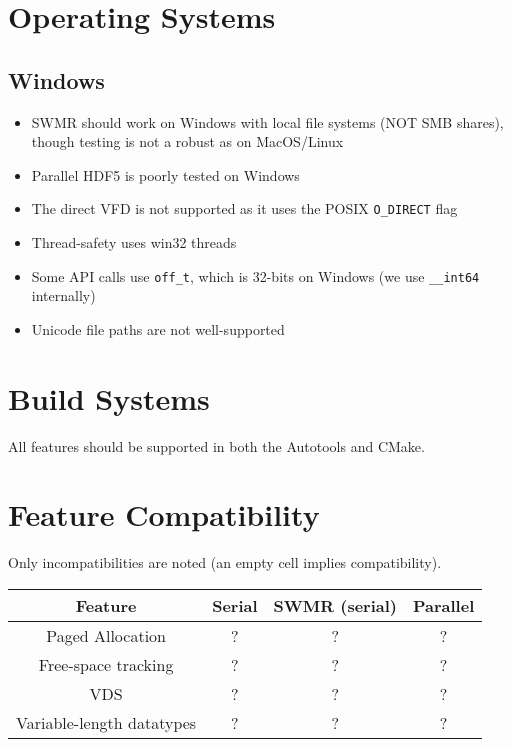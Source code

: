 
\section{Operating Systems}

\subsection{Windows}
\begin{itemize}
    \item SWMR should work on Windows with local file systems (NOT SMB shares), though testing is not a robust as on MacOS/Linux
    \item Parallel HDF5 is poorly tested on Windows
    \item The direct VFD is not supported as it uses the POSIX \texttt{O\_DIRECT} flag
    \item Thread-safety uses win32 threads
    \item Some API calls use \texttt{off\_t}, which is 32-bits on Windows (we use \texttt{\_\_int64} internally)
    \item Unicode file paths are not well-supported
\end{itemize}

\section{Build Systems}

All features should be supported in both the Autotools and CMake.

\section{Feature Compatibility}

Only incompatibilities are noted (an empty cell implies compatibility).

\begin{minipage}{\textwidth}
  \begin{center}
    \begin{tabular}{|| c | c | c | c ||}
      \hline
      Feature & Serial & SWMR (serial) & Parallel \\
      \hline
      Paged Allocation & ? & ? & ? \\
      \hline
      Free-space tracking & ? & ? & ?\\
      \hline
      VDS & ? & ? & ? \\
      \hline
      Variable-length datatypes & ? & ? & ? \\
      \hline
    \end{tabular}
  \end{center}
\end{minipage}

